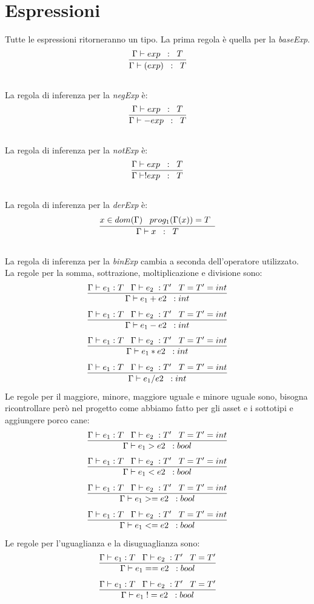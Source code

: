 \documentclass[12pt, a4paper]{report}
\begin{document}
\section{Espressioni}
Tutte le espressioni ritorneranno un tipo. La prima regola è quella per la \emph{baseExp}.\\
\[\infer{\Gamma \vdash (exp) \;\; : \;\; T}{\Gamma \vdash exp \;\;  : \;\; T }\]\\
La regola di inferenza per la \emph{negExp} è:\\
\[\infer{\Gamma \vdash -exp \;\; : \;\; T}{\Gamma \vdash exp \;\;  : \;\; T }\]\\
La regola di inferenza per la \emph{notExp} è:\\
\[\infer{\Gamma \vdash !exp \;\; : \;\; T}{\Gamma \vdash exp \;\;  : \;\; T }\]\\
La regola di inferenza per la \emph{derExp} è:\\
\[\infer{\Gamma \vdash x \;\; : \;\; T}{x \in dom(\Gamma) \;\;\; prog_1(\Gamma(x)) = T \;\; }\]\\
La regola di inferenza per la \emph{binExp} cambia a seconda dell'operatore utilizzato. La regole per la somma, sottrazione, moltiplicazione e divisione sono:
\[ \infer{\Gamma \vdash e_1 + e2 \;\; : int}{\Gamma \vdash e_1 :T \;\;\; \Gamma \vdash e_2 \; : T' \;\;\; T=T'=int} \]
\[ \infer{\Gamma \vdash e_1 - e2 \;\; : int}{\Gamma \vdash e_1 :T \;\;\; \Gamma \vdash e_2 \; : T' \;\;\; T=T'=int} \]
\[ \infer{\Gamma \vdash e_1 * e2 \;\; : int}{\Gamma \vdash e_1 :T \;\;\; \Gamma \vdash e_2 \; : T' \;\;\; T=T'=int} \]
\[ \infer{\Gamma \vdash e_1 / e2 \;\; : int}{\Gamma \vdash e_1 :T \;\;\; \Gamma \vdash e_2 \; : T' \;\;\; T=T'=int} \]
Le regole per il maggiore, minore, maggiore uguale e minore uguale sono, bisogna ricontrollare però nel progetto come abbiamo fatto per gli asset e i sottotipi e aggiungere porco cane:
\[ \infer{\Gamma \vdash e_1 > e2 \;\; : bool}{\Gamma \vdash e_1 :T \;\;\; \Gamma \vdash e_2 \; : T' \;\;\; T=T'=int} \]
\[ \infer{\Gamma \vdash e_1 < e2 \;\; : bool}{\Gamma \vdash e_1 :T \;\;\; \Gamma \vdash e_2 \; : T' \;\;\; T=T'=int} \]
\[ \infer{\Gamma \vdash e_1 >= e2 \;\; : bool}{\Gamma \vdash e_1 :T \;\;\; \Gamma \vdash e_2 \; : T' \;\;\; T=T'=int} \]
\[ \infer{\Gamma \vdash e_1 <= e2 \;\; : bool}{\Gamma \vdash e_1 :T \;\;\; \Gamma \vdash e_2 \; : T' \;\;\; T=T'=int} \]
Le regole per l'uguaglianza e la disuguaglianza sono:
\[ \infer{\Gamma \vdash e_1 == e2 \;\; : bool}{\Gamma \vdash e_1 :T \;\;\; \Gamma \vdash e_2 \; : T' \;\;\; T=T'} \]
\[ \infer{\Gamma \vdash e_1 \; != e2 \;\; : bool}{\Gamma \vdash e_1 :T \;\;\; \Gamma \vdash e_2 \; : T' \;\;\; T=T'} \]
\end{document}
